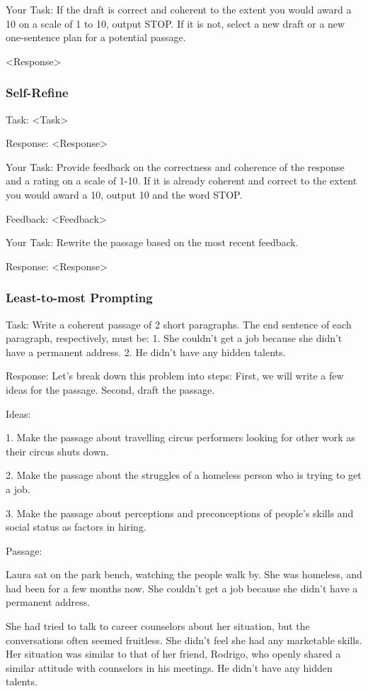 \documentclass[11pt]{article}
\begin{document}
Your Task: If the draft is correct and coherent to the extent you would award a 10 on a scale of 1 to 10, output STOP. If it is not, select a new draft or a new one-sentence plan for a potential passage.

<Response>

\subsubsection*{Self-Refine}

Task: <Task>

Response: <Response>

Your Task: Provide feedback on the correctness and coherence of the response and a rating on a scale of 1-10. If it is already coherent and correct to the extent you would award a 10, output 10 and the word STOP.

Feedback: <Feedback>

Your Task: Rewrite the passage based on the most recent feedback.

Response: <Response>

\subsubsection*{Least-to-most Prompting}

Task: Write a coherent passage of 2 short paragraphs. The end sentence of each paragraph, respectively, must be: 1. She couldn't get a job because she didn't have a permanent address. 2. He didn't have any hidden talents.

Response: Let's break down this problem into steps: First, we will write a few ideas for the passage. Second, draft the passage.

Ideas:

1. Make the passage about travelling circus performers looking for other work as their circus shuts down.

2. Make the passage about the struggles of a homeless person who is trying to get a job. 

3. Make the passage about perceptions and preconceptions of people's skills and social status as factors in hiring.

Passage: 

Laura sat on the park bench, watching the people walk by. She was homeless, and had been for a few months now. She couldn't get a job because she didn't have a permanent address.

She had tried to talk to career counselors about her situation, but the conversations often seemed fruitless. She didn't feel she had any marketable skills. Her situation was similar to that of her friend, Rodrigo, who openly shared a similar attitude with counselors in his meetings. He didn't have any hidden talents.
\end{document}
